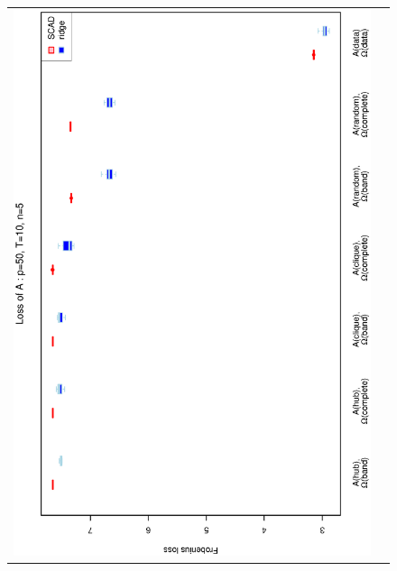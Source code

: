 \begin{figure}[h!]
\centering
\begin{tabular}{cc}
\includegraphics[scale=0.45,angle=270]{LossA50T10N5_25.eps}
\\

\end{tabular}
\end{figure}
